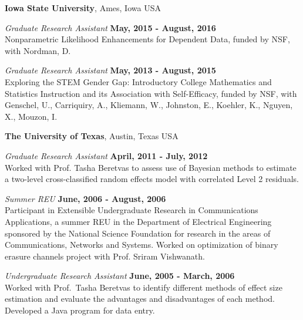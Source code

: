 \documentclass[margin,line]{res}
\begin{document}
\begin{resume}
{\bf Iowa State University}, Ames, Iowa USA

\vspace{-.3cm}

{\em Graduate Research Assistant} \hfill {\bf May, 2015 - August, 2016}\\
Nonparametric Likelihood Enhancements for Dependent Data, funded by NSF, with Nordman, D.

{\em Graduate Research Assistant} \hfill {\bf May, 2013 - August, 2015}\\
Exploring the STEM Gender Gap: Introductory College Mathematics and Statistics Instruction and its Association with Self-Efficacy, funded by NSF, with Genschel, U., Carriquiry, A., Kliemann, W., Johnston, E., Koehler, K., Nguyen, X., Mouzon, I.

{\bf The University of Texas}, Austin, Texas USA

\vspace{-.3cm}
{\em Graduate Research Assistant} \hfill {\bf April, 2011 - July, 2012}\\
Worked with Prof. Tasha Beretvas to assess use of Bayesian methods to estimate a two-level cross-classified random effects model with correlated Level 2 residuals.




{\em Summer REU} \hfill {\bf June, 2006 - August, 2006}\\
Participant in Extensible Undergraduate Research in Communications Applications, a summer REU in the Department of Electrical Engineering sponsored by the National Science Foundation for research in the areas of Communications, Networks and Systems. Worked on optimization of binary erasure channels project with Prof. Sriram Vishwanath.

{\em Undergraduate Research Assistant} \hfill {\bf June, 2005 - March, 2006}\\
Worked with Prof.\ Tasha Beretvas to identify different methods of effect size estimation and evaluate the advantages and disadvantages of each method. Developed a Java program for data entry.


\end{resume}
\end{document}
